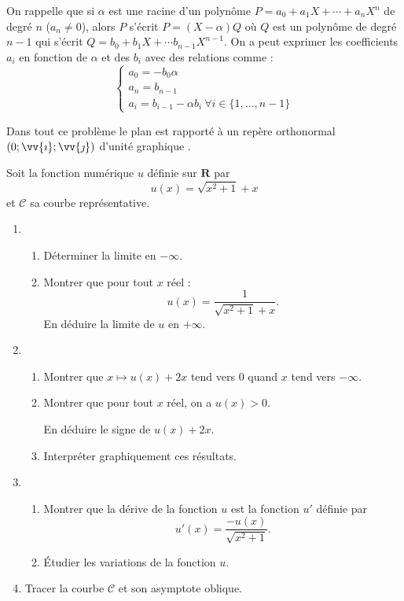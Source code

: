 \documentclass[12pt,a4paper,french]{article}
\newcommand{\R}{\mathbf{R}}
\theoremstyle{break}
\theoremstyle{plain}
\theoremstyle{nonumberplain}
\theoremstyle{nonumberbreak}
\begin{document}
\begin{bclogo}[noborder,logo=\bcoutil]{}%
  On rappelle que si $\alpha$ est une racine d'un polynôme $P = a_0 +
  a_1X + \cdots + a_nX^n$ de degré $n$ ($a_n \neq 0$), alors $P$ s'écrit
  $P = (X-\alpha)Q$ où $Q$ est un polynôme de degré $n -1$ qui
  s'écrit $Q = b_0 + b_1X + \cdots b_{n-1}X^{n-1}$. On a peut exprimer
  les coefficients $a_i$ en fonction de $\alpha$ et des $b_i$ avec des
  relations comme : \[ \left\lbrace \begin{array}{l} a_0 = -b_0\alpha \\
    a_n = b_{n-1} \\ a_i = b_{i-1} - \alpha b_i \ \forall i \in
  \{1,\dots,n-1\} \end{array} \right. \]
\end{bclogo}

\begin{question}[subtitle={Vers le bac : Nouvelle calédonie 2000},
  topic={continuité},class=3]
  \begin{multicols}{2}
    Dans tout ce problème le plan est rapporté à un repère orthonormal
    $(0;\vv{\imath};\vv{\jmath})$ d'unité graphique .

    Soit la fonction numérique $u$ définie sur $\R$ par \[ u(x) =
    \sqrt{x^2 + 1} + x \] et $\mathscr{C}$ sa courbe représentative.
    \begin{enumerate}
      \item \begin{enumerate}
          \item Déterminer la limite en $-\infty$.
          \item Montrer que pour tout $x$ réel : \[ u(x) = \frac1{\sqrt{x^2
            + 1} + x} .\] En déduire la limite de $u$ en $+\infty$.
        \end{enumerate}
      \item \begin{enumerate}
          \item Montrer que $x\mapsto u(x) + 2x$ tend vers 0 quand $x$ tend
            vers $-\infty$.
          \item Montrer que pour tout $x$ réel, on a $u(x) > 0$.

            En déduire le signe de $u(x) + 2x$.
          \item Interpréter graphiquement ces résultats.
        \end{enumerate}
      \item \begin{enumerate}
          \item Montrer que la dérive de la fonction $u$ est la fonction
            $u'$ définie par \[ u'(x) = \frac{-u(x)}{\sqrt{x^2 + 1}} .\]
          \item Étudier les variations de la fonction $u$.
        \end{enumerate}
      \item Tracer la courbe $\mathscr{C}$ et son asymptote oblique.
    \end{enumerate}
  \end{multicols}
\end{question}
\end{document}
